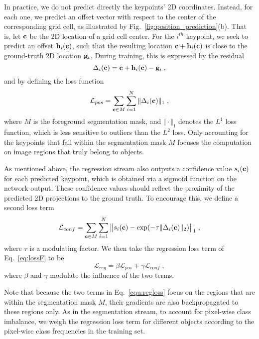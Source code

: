 \documentclass[10pt,twocolumn,letterpaper]{article}
\begin{document}
In practice, we do not predict directly the keypoints' 2D coordinates. Instead, for each one, we predict an offset vector with respect to the center of the corresponding grid cell, as illustrated by Fig.~\ref{fig:position_prediction}(b). That is, let ${\bf c}$ be the 2D location of a grid cell center. For the $i^{th}$ keypoint, we seek to predict an offset ${\bf h}_i({\bf c})$, such that the resulting location ${\bf c} + {\bf h}_i({\bf c})$ is close to the ground-truth 2D location ${\bf g}_i$. During training, this is expressed by the residual 
\begin{equation}
{\Delta}_i({\bf c}) = {\bf c} + {\bf h}_i({\bf c}) - {\bf g}_i\;,
\end{equation}
and by defining the loss function
\begin{equation}
{\mathcal L}_{pos} = \sum_{{\bf c}\in M} \sum_{i=1}^{N} \Vert {\Delta}_i({\bf c}) \Vert_{1} \;,
\label{equ:xyregression}
\end{equation}
where $M$ is the foreground segmentation mask, and $\Vert\cdot\Vert_{1}$ denotes the $L^1$ loss function, which is less sensitive to outliers than the $L^2$ loss. Only accounting for the keypoints that fall within the segmentation mask $M$ focuses the computation on image regions that truly belong to objects.

As mentioned above, the regression stream also outputs a confidence value $s_i({\bf c})$ for each predicted keypoint, which is obtained via a sigmoid function on the network output. These confidence values should  reflect the proximity of the predicted 2D projections to the ground truth. To encourage this, we define a second loss term 
\begin{equation}
{\mathcal L}_{conf} = \sum_{{\bf c}\in M} \sum_{i=1}^{N} \big \Vert s_i({\bf c})  - \exp(-\tau \Vert {\Delta}_i({\bf c}) \Vert_{2} ) \big \Vert_{1}\;,
\label{equ:confregression}
\end{equation}
where $\tau$ is a modulating factor.  
We then take the regression loss term of Eq.~\ref{eq:lossF} to be
\begin{equation}
{\mathcal L}_{reg}= \beta{\mathcal L}_{pos} + \gamma{\mathcal L}_{conf}\;,
\label{equ:regloss}
\end{equation}
where $\beta$ and $\gamma$ modulate the influence of the two terms. 

Note that because the two terms in Eq.~\ref{equ:regloss} focus on the regions that are within the segmentation mask $M$, their gradients are also backpropagated to these regions only. As in the segmentation stream, to account for pixel-wise class imbalance, we weigh the regression loss term for different objects according to the pixel-wise class frequencies in the training set.
\end{document}
